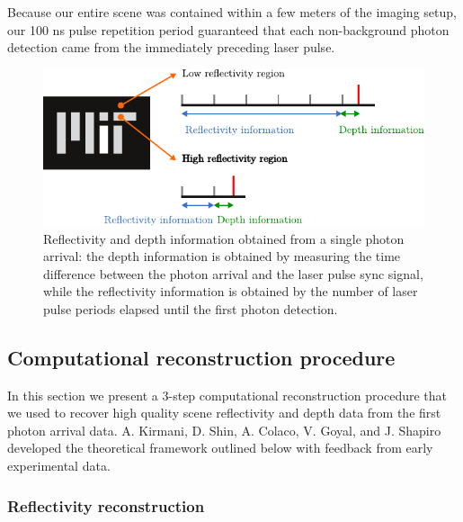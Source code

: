 Because our entire scene was contained within a few meters of the imaging setup, our 100 ns pulse repetition period guaranteed that each non-background photon detection came from the immediately preceding laser pulse.

\begin{figure}[htb]
\centerline{\includegraphics[width=14cm]{figure-first-pulses.pdf}}
\caption{Reflectivity and depth information obtained from a single photon arrival: the depth information is obtained by measuring the time difference between the photon arrival and the laser pulse sync signal, while the reflectivity information is obtained by the number of laser pulse periods elapsed until the first photon detection.}
\label{figure:first-pulses}
\end{figure}

\subsection{Computational reconstruction procedure}

In this section we present a 3-step computational reconstruction procedure that we used to recover high quality scene reflectivity and depth data from the first photon arrival data. A. Kirmani, D. Shin, A. Colaco, V. Goyal, and J. Shapiro developed the theoretical framework outlined below \cite{kirmani-first,kirmani-photon} with feedback from early experimental data.

\subsubsection{Reflectivity reconstruction}

